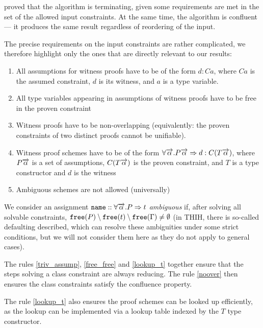 \citet{vytiniotis2011outsidein} proved that the algorithm is terminating, given some requirements are met in the set of the allowed input constraints. At the same time, the algorithm is confluent --- it produces the same result regardless of reordering of the input.

The precise requirements on the input constraints are rather complicated, we therefore highlight only the ones that are directly relevant to our results:

\begin{enumerate}
    \item All assumptions for witness proofs have to be of the form $d : C a$, where $C a$ is the assumed constraint, $d$ is its witness, and $a$ is a type variable. \label{triv_assump}
    \item All type variables appearing in assumptions of witness proofs have to be free in the proven constraint \label{free_free}
    \item Witness proofs have to be non-overlapping (equivalently: the proven constraints of two distinct proofs cannot be unifiable). \label{noover}
    \item Witness proof schemes have to be of the form $\forall \overrightarrow{\alpha} . P \overrightarrow{\alpha} \Rightarrow d : C (T \overrightarrow{\alpha})$, where $P \overrightarrow{\alpha}$ is a set of assumptions, $C (T \overrightarrow{\alpha})$ is the proven constraint, and $T$ is a type constructor and $d$ is the witness \label{lookup_t}
    \item Ambiguous schemes are not allowed (universally) \label{ambi_rule}
\end{enumerate}

We consider an assignment $\mathtt{name} :: \forall \overrightarrow{\alpha} . P  \Rightarrow t$ \emph{ambiguous} if, after solving all solvable constraints, $\mathtt{free} (P) \setminus \mathtt{free} (t) \setminus \mathtt{free} (\Gamma) \neq \emptyset$ (in THIH, there is so-called defaulting described, which can resolve these ambiguities under some strict conditions, but we will not consider them here as they do not apply to general cases).

The rules \ref{triv_assump}, \ref{free_free} and \ref{lookup_t} together ensure that the steps solving a class constraint are always reducing. The rule \ref{noover} then ensures the class constraints satisfy the confluence property.

The rule \ref{lookup_t} also ensures the proof schemes can be looked up efficiently, as the lookup can be implemented via a lookup table indexed by the $T$ type constructor.

